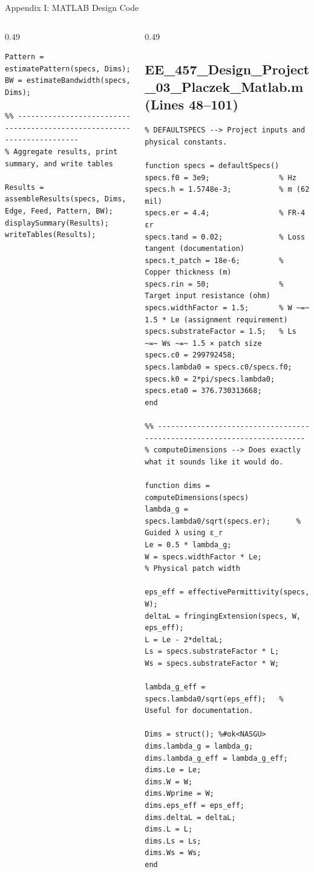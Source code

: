 \documentclass[compress,aspectratio=169,10pt]{beamer}
\begin{document}
\begin{frame}[fragile]{Appendix I: MATLAB Design Code}
\begin{columns}[T]
\begin{column}{0.49\textwidth}
\begin{lstlisting}
Pattern = estimatePattern(specs, Dims);
BW = estimateBandwidth(specs, Dims);

%% ------------------------------------------------------------------------
% Aggregate results, print summary, and write tables

Results = assembleResults(specs, Dims, Edge, Feed, Pattern, BW);
displaySummary(Results);
writeTables(Results);
            \end{lstlisting}
        \end{column}
        \begin{column}{0.49\textwidth}
\subsection[Design code 2]{EE\_457\_Design\_Project\_03\_Placzek\_Matlab.m (Lines 48--101)}
            \begin{lstlisting}[firstnumber=48]
%% ------------------------------------------------------------------------
% DEFAULTSPECS --> Project inputs and physical constants.

function specs = defaultSpecs()
specs.f0 = 3e9;                % Hz
specs.h = 1.5748e-3;           % m (62 mil)
specs.er = 4.4;                % FR-4 εr
specs.tand = 0.02;             % Loss tangent (documentation)
specs.t_patch = 18e-6;         % Copper thickness (m)
specs.rin = 50;                % Target input resistance (ohm)
specs.widthFactor = 1.5;       % W ~=~ 1.5 * Le (assignment requirement)
specs.substrateFactor = 1.5;   % Ls ~=~ Ws ~=~ 1.5 × patch size
specs.c0 = 299792458;
specs.lambda0 = specs.c0/specs.f0;
specs.k0 = 2*pi/specs.lambda0;
specs.eta0 = 376.730313668;
end

%% ------------------------------------------------------------------------
% computeDimensions --> Does exactly what it sounds like it would do.

function dims = computeDimensions(specs)
lambda_g = specs.lambda0/sqrt(specs.er);      % Guided λ using ε_r
Le = 0.5 * lambda_g;
W = specs.widthFactor * Le;                   % Physical patch width

eps_eff = effectivePermittivity(specs, W);
deltaL = fringingExtension(specs, W, eps_eff);
L = Le - 2*deltaL;
Ls = specs.substrateFactor * L;
Ws = specs.substrateFactor * W;

lambda_g_eff = specs.lambda0/sqrt(eps_eff);   % Useful for documentation.

Dims = struct(); %#ok<NASGU>
dims.lambda_g = lambda_g;
dims.lambda_g_eff = lambda_g_eff;
dims.Le = Le;
dims.W = W;
dims.Wprime = W;
dims.eps_eff = eps_eff;
dims.deltaL = deltaL;
dims.L = L;
dims.Ls = Ls;
dims.Ws = Ws;
end


\end{lstlisting}
\end{column}
\end{columns}
\end{frame}
\end{document}
